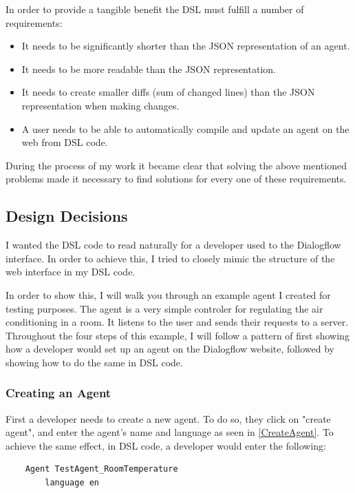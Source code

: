 In order to provide a tangible benefit the DSL must fulfill a number of requirements:
\begin{itemize}
    \item It needs to be significantly shorter than the JSON representation of an agent.
    \item It needs to be more readable than the JSON representation.
    \item It needs to create smaller diffs (sum of changed lines) than the JSON representation when making changes.
    \item A user needs to be able to automatically compile and update an agent on the web from DSL code.
\end{itemize}

During the process of my work it became clear that solving the above mentioned problems made it necessary to find solutions for every one of these requirements.

\subsection{Design Decisions}

I wanted the DSL code to read naturally for a developer used to the Dialogflow interface.
In order to achieve this, I tried to closely mimic the structure of the web interface in my DSL code.

In order to show this, I will walk you through an example agent I created for testing purposes. The agent is a very simple controler for regulating the air conditioning in a room. It listens to the user and sends their requests to a server. Throughout the four steps of this example, I will follow a pattern of first showing how a developer would set up an agent on the Dialogflow website, followed by showing how to do the same in DSL code.

\subsubsection{Creating an Agent}
First a developer needs to create a new agent. To do so, they click on "create agent", and enter the agent's name and language as seen in \autoref{CreateAgent}.
To achieve the same effect, in DSL code, a developer would enter the following:

\begin{verbatim}
    Agent TestAgent_RoomTemperature
        language en 
\end{verbatim}

